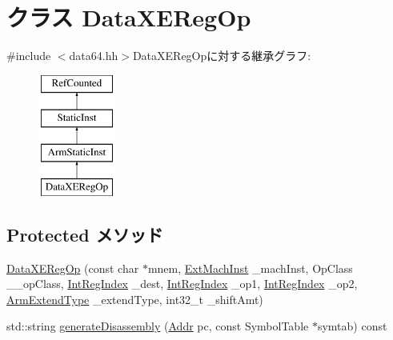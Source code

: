 \hypertarget{classArmISA_1_1DataXERegOp}{
\section{クラス DataXERegOp}
\label{classArmISA_1_1DataXERegOp}
}


{\ttfamily \#include $<$data64.hh$>$}DataXERegOpに対する継承グラフ:\begin{figure}[H]
\begin{center}
\leavevmode
\includegraphics[height=4cm]{classArmISA_1_1DataXERegOp}
\end{center}
\end{figure}
\subsection*{Protected メソッド}
\begin{DoxyCompactItemize}
\item 
\hyperlink{classArmISA_1_1DataXERegOp_a98dcf248cf9e3deff3530cab32aa09ea}{DataXERegOp} (const char $\ast$mnem, \hyperlink{classStaticInst_a5605d4fc727eae9e595325c90c0ec108}{ExtMachInst} \_\-machInst, OpClass \_\-\_\-opClass, \hyperlink{namespaceArmISA_ae64680ba9fb526106829d6bf92fc791b}{IntRegIndex} \_\-dest, \hyperlink{namespaceArmISA_ae64680ba9fb526106829d6bf92fc791b}{IntRegIndex} \_\-op1, \hyperlink{namespaceArmISA_ae64680ba9fb526106829d6bf92fc791b}{IntRegIndex} \_\-op2, \hyperlink{namespaceArmISA_a4420842b5673543552a3aba317c69dbb}{ArmExtendType} \_\-extendType, int32\_\-t \_\-shiftAmt)
\item 
std::string \hyperlink{classArmISA_1_1DataXERegOp_a95d323a22a5f07e14d6b4c9385a91896}{generateDisassembly} (\hyperlink{classm5_1_1params_1_1Addr}{Addr} pc, const SymbolTable $\ast$symtab) const 
\end{DoxyCompactItemize}
